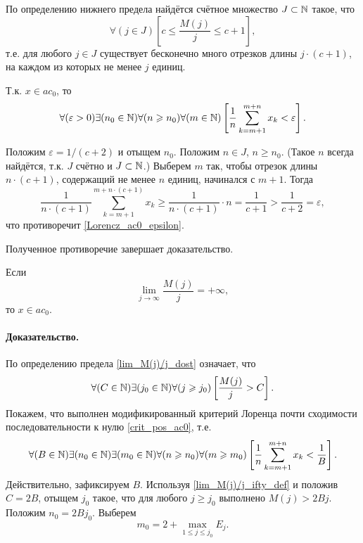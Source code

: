 По определению нижнего предела найдётся счётное множество
$J\subset\N$ такое, что
\begin{equation}
	\forall(j\in J)\left[c \leq \frac{M(j)}{j} \leq c+1 \right],
\end{equation}
т.е. для любого $j\in J$ существует бесконечно много отрезков длины $j\cdot(c+1)$,
на каждом из которых не менее $j$ единиц.

Т.к. $x\in ac_0$, то
\begin{equation}\label{Lorencz_ac0_epsilon}
	\forall(\varepsilon>0)
	\exists(n_0\in\N)
	\forall(n \geq n_0)
	\forall(m\in\N)
	\left[
		\frac{1}{n} \sum_{k=m+1}^{m+n}x_k < \varepsilon
	\right]
	.
\end{equation}

Положим $\varepsilon = 1/(c+2)$ и отыщем $n_0$.
Положим $n\in J$, $n\geq n_0$.
(Такое $n$ всегда найдётся, т.к. $J$ счётно и $J\subset\N$.)
Выберем $m$ так, чтобы отрезок длины $n\cdot(c+1)$,
содержащий не менее $n$ единиц,
начинался с $m+1$.
Тогда
\begin{equation}
	\frac{1}{n\cdot(c+1)}\sum_{k=m+1}^{m+n\cdot(c+1)}x_k
	\geq
	\frac{1}{n\cdot(c+1)} \cdot n
	=
	\frac{1}{c+1}
	>
	\frac{1}{c+2}
	=
	\varepsilon,
\end{equation}
что противоречит \eqref{Lorencz_ac0_epsilon}.

Полученное противоречие завершает доказательство.


\begin{lemma}
	\label{thm:lim_M(j)/j_dost}
	Если
	\begin{equation}\label{lim_M(j)/j_dost}
		\lim_{j \to \infty} \frac{M(j)}{j} = +\infty
		,
	\end{equation}
	то $x \in ac_0$.
\end{lemma}

\paragraph{Доказательство.}

По определению предела \eqref{lim_M(j)/j_dost} означает, что
\begin{equation}\label{lim_M(j)/j_ifty_def}
	\forall(C  \in\N)
	\exists(j_0\in\N)
	\forall(j \geq j_0)
	\left[
		\frac{M(j)}{j}>C
	\right]
	.
\end{equation}
Покажем, что выполнен модификированный критерий Лоренца почти сходимости последовательности к нулю
\eqref{crit_pos_ac0}, т.е.
\begin{equation}
	\forall(B  \in\N)
	\exists(n_0\in\N)
	\exists(m_0\in\N)
	\forall(n\geq n_0)
	\forall(m\geq m_0)
	\\
	\left[
		\frac{1}{n}
		\sum_{k=m+1}^{m+n} x_k
		<
		\frac{1}{B}
	\right]
	.
\end{equation} Действительно, зафиксируем $B$.
Используя \eqref{lim_M(j)/j_ifty_def} и положив $C=2B$,
отыщем $j_0$ такое, что для любого $j\geq j_0$ выполнено
$M(j)>2Bj$.
Положим $n_0 = 2Bj_0$.
Выберем
$$
	m_0 = 2+\max_{1\leq j \leq j_0} E_j
	.
$$

